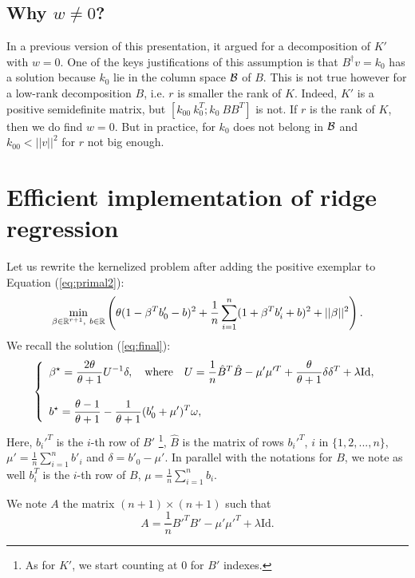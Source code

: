 \documentclass[12pt,letterpaper]{article}
\begin{document}
\subsection{Why $w\ne 0$?}
In a previous version of this presentation, it argued for a decomposition of $K'$ with $w=0$.
One of the keys justifications of this assumption is that $B^\dagger v=k_0$ has a solution because $k_0$ lie in the column space $\cal B$ of $B$. 
This is not true however for a low-rank decomposition $B$, i.e. $r$ is smaller the rank of $K$. 
Indeed, $K'$ is a positive semidefinite matrix, but $[k_{00}\ k_0^T; k_0\ BB^T]$ is not. 
If $r$ is the rank of $K$, then we do find $w=0$.
But in practice, for $k_0$ does not belong in $\cal B$ and $k_{00}<||v||^2$ for $r$ not big enough.

\section{Efficient implementation of ridge regression}
Let us rewrite the kernelized problem after adding the positive exemplar to Equation (\ref{eq:primal2}):
\begin{equation}
\min_{\beta\in\mathbb{R}^{r+1}, \ b\in\mathbb{R}}\left( \theta (1-\beta^Tb_0'-b)^2+\dfrac{1}{n}\sum_{i=1}^n (1+\beta^Tb_i'+b)^2 +||\beta||^2\right).
\end{equation}
We recall the solution (\ref{eq:final}):
\begin{align}
\left\{\begin{array}{l}
\vspace{5 mm}
\displaystyle \beta^\star=\dfrac{2\theta}{\theta+1}U^{-1} \delta,\quad\text{where}\quad
U=\dfrac{1}{n}\hat{B}^T\hat{B}-\mu'\mu'^T
+\frac{\theta}{\theta+1}\delta\delta^T +\lambda\text{Id},\\
\displaystyle b^\star=\dfrac{\theta-1}{\theta+1}-\frac{1}{\theta+1}(b'_0+\mu')^T \omega,
\end{array}\right.
\label{kernel:final}
\end{align} 
Here, $b_i'^T$ is the $i$-th row of $B'$
\footnote{As for $K'$, we start counting at $0$ for $B'$ indexes.}, $\hat{B}$ is the matrix of rows $b_i'^T$, $i$ in $\{1,2,...,n\}$,
$\mu' = \frac{1}{n}\sum_{i=1}^nb'_i$ and $\delta = b'_0-\mu'$.
In parallel with the notations for $B$, we note as well $b_i^T$ is the $i$-th row of $B$, $\mu = \frac{1}{n}\sum_{i=1}^nb_i$.

We note $A$ the matrix $(n+1)\times (n+1)$ such that
\begin{equation}
A = \dfrac{1}{n}B'^TB'-\mu'\mu'^T+\lambda\text{Id}.\label{eq:A}
\end{equation}
\end{document}
